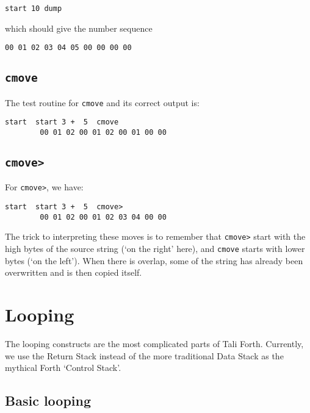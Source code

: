 \begin{lstlisting}[frame=lines]
        start 10 dump
\end{lstlisting}

\noindent which should give the number sequence

\begin{lstlisting}[frame=lines]
        00 01 02 03 04 05 00 00 00 00
\end{lstlisting}

\subsection{\texttt{cmove}}

\noindent The test routine for \texttt{cmove} and its correct output is:

\begin{lstlisting}[frame=lines]
        start  start 3 +  5  cmove
        00 01 02 00 01 02 00 01 00 00
\end{lstlisting}

\subsection{\texttt{cmove>}}

\indent For \texttt{cmove>}, we have: 

\begin{lstlisting}[frame=lines]
        start  start 3 +  5  cmove>
        00 01 02 00 01 02 03 04 00 00
\end{lstlisting}

The trick to interpreting these moves is to remember that \texttt{cmove>} start
with the high bytes of the source string (`on the right' here), and
\texttt{cmove} starts with lower bytes (`on the left'). When there is overlap,
some of the string has already been overwritten and is then copied itself.

\section{Looping}

The looping constructs are the most complicated parts of Tali Forth. Currently,
we use the Return Stack instead of the more traditional Data Stack as the
mythical Forth `Control Stack'.

\subsection{Basic looping}

